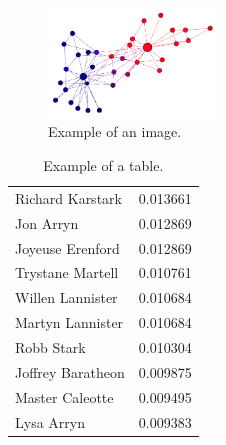 \documentclass[9pt]{IEEEtran}
\begin{document}
\begin{figure}[h] \centering
    \includegraphics[width=0.4\textwidth]{karate.png}
    \caption{{Example of an image.}}
    \label{fig:karate}
\end{figure}


 
\begin{table}
    \begin{center}
    \caption{Example of a table.}
        \begin{tabular}{ l | r }
        
        Richard Karstark & 0.013661 \\
        Jon Arryn & 0.012869 \\
        Joyeuse Erenford & 0.012869 \\
        Trystane Martell & 0.010761 \\
        Willen Lannister & 0.010684 \\
        Martyn Lannister & 0.010684 \\
        Robb Stark & 0.010304 \\
        Joffrey Baratheon & 0.009875 \\
        Master Caleotte & 0.009495 \\
        Lysa Arryn & 0.009383 \\
        \end{tabular}
    \label{tab:pagerankGOT}
    \end{center}
\end{table}





\end{document}

